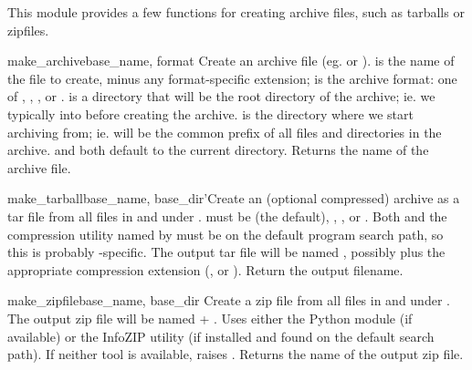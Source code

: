 \documentclass{manual}
\begin{document}
This module provides a few functions for creating archive files, such as 
tarballs or zipfiles.

\begin{funcdesc}{make_archive}{base_name, format}
Create an archive file (eg.  or ).   
is the name of the file to create, minus any format-specific extension; 
 is the archive format: one of , , 
, or .
 is a directory that will be the root directory of the
archive; ie. we typically  into  before 
creating the archive.   is the directory where we start 
archiving from; ie.  will be the common prefix of all files and
directories in the archive.   and  both default
to the current directory.  Returns the name of the archive file.

\end{funcdesc}

\begin{funcdesc}{make_tarball}{base_name, base_dir}'Create an (optional compressed) archive as a tar file from all files in and under .  must be  (the default), 
, , or .  Both 
and the compression utility named by  must be on the 
default program search path, so this is probably \UNIX-specific.  The 
output tar file will be named , possibly plus
the appropriate compression extension (,  or
).  Return the output filename.

\end{funcdesc}

\begin{funcdesc}{make_zipfile}{base_name, base_dir}
Create a zip file from all files in and under .  The output
zip file will be named  + .  Uses either the 
 Python module (if available) or the InfoZIP  
utility (if installed and found on the default search path).  If neither 
tool is available, raises .  
Returns the name of the output zip file.
\end{funcdesc}
\end{document}
